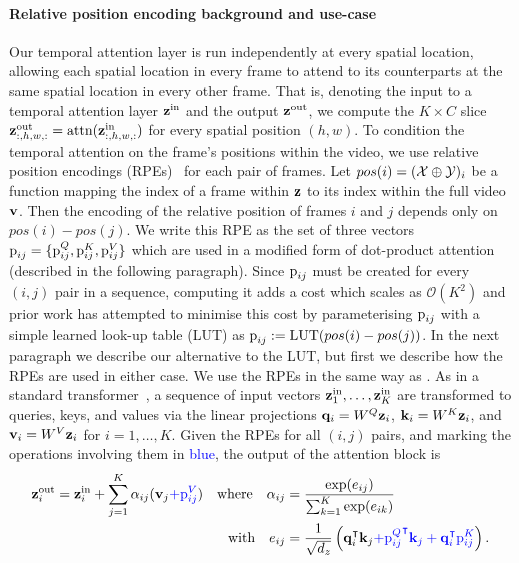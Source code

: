 \paragraph{Relative position encoding background and use-case} Our temporal attention layer is run independently at every spatial location, allowing each spatial location in every frame to attend to its counterparts at the same spatial location in every other frame. That is, denoting the input to a temporal attention layer ${\mathbf{z}}^\text{in}$ and the output ${\mathbf{z}}^\text{out}$, we compute the $K \times C$ slice ${\mathbf{z}}^\text{out}_{:,h,w,:} = \text{attn}({\mathbf{z}}^\text{in}_{:,h,w,:})$ for every spatial position $(h,w)$. To condition the temporal attention on the frame's positions within the video, we use relative position encodings (RPEs)~\citep{shaw2018self,wu2021rethinking} for each pair of frames. Let $pos(i) = (\mathcal{X}\oplus\mathcal{Y})_i$ be a function mapping the index of a frame within ${\mathbf{z}}$ to its index within the full video ${\mathbf{v}}$. Then the encoding of the relative position of frames $i$ and $j$ depends only on $pos(i)-pos(j)$. We write this RPE as the set of three vectors ${\textnormal{p}}_{ij} = \{{\textnormal{p}}_{ij}^Q, {\textnormal{p}}_{ij}^K, {\textnormal{p}}_{ij}^V\}$ which are used in a modified form of dot-product attention (described in the following paragraph). Since ${\textnormal{p}}_{ij}$ must be created for every $(i,j)$ pair in a sequence, computing it adds a cost which scales as $\mathcal{O}(K^2)$ and prior work has attempted to minimise this cost by parameterising ${\textnormal{p}}_{ij}$ with a simple learned look-up table (LUT) as ${{\textnormal{p}}_{ij} := \text{LUT}(pos(i)-pos(j))}$. In the next paragraph we describe our alternative to the LUT, but first we describe how the RPEs are used in either case. We use the RPEs in the same way as \citet{shaw2018self}. As in a standard transformer~\citep{vaswani2017attention}, a sequence of input vectors ${\mathbf{z}}_1^\text{in},\ldots,{\mathbf{z}}_{K}^\text{in}$ are transformed to queries, keys, and values via the linear projections ${\mathbf{q}}_i = W^Q {\mathbf{z}}_i$, ${\mathbf{k}}_i = W^K {\mathbf{z}}_i$, and ${\mathbf{v}}_i = W^V {\mathbf{z}}_i$ for $i=1,\ldots,K$. Given the RPEs for all $(i,j)$ pairs, and marking the operations involving them in \textcolor{blue}{blue}, the output of the attention block is
\begin{align}
    {\mathbf{z}}_i^\text{out} = {\mathbf{z}}^\text{in}_i + \sum_{j=1}^K \alpha_{ij}({\mathbf{v}}_j \textcolor{blue}{+ {\textnormal{p}}_{ij}^V}) \quad \text{where} \quad \alpha_{ij} &= \frac{\exp(e_{ij})}{\sum_{k=1}^K\exp(e_{ik})} \\
    \text{with} \quad e_{ij} &= \frac{1}{\sqrt{d_z}} \left( {\mathbf{q}}_i^\intercal {\mathbf{k}}_j \textcolor{blue}{+ {{\textnormal{p}}_{ij}^Q}^\intercal {\mathbf{k}}_j + {\mathbf{q}}_i^\intercal {{\textnormal{p}}_{ij}^K}} \right). \nonumber
\end{align}

